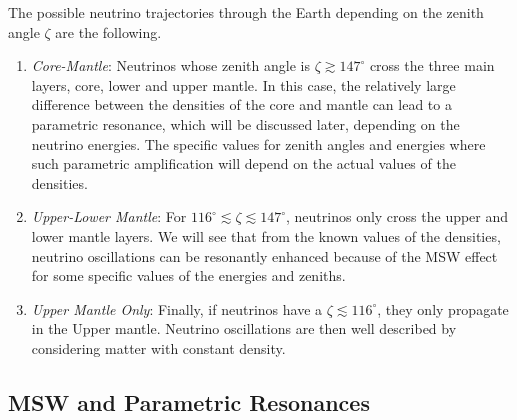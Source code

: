 The possible neutrino trajectories through the Earth depending on the zenith angle $\zeta$ are the following.
\begin{enumerate}
	\item \emph{Core-Mantle}: Neutrinos whose zenith angle is $\zeta \gtrsim 147^{\circ}$ cross the three main layers, core, lower and upper mantle. In this case, the relatively large difference between the densities of the core and mantle  can lead to a parametric resonance, which will be discussed later, depending on the neutrino energies. The specific values for zenith angles and energies where such parametric amplification will depend on the actual values of the densities. 
	\item \emph{Upper-Lower Mantle}: For $116^{\circ} \lesssim \zeta \lesssim 147^{\circ}$, neutrinos only cross the upper and lower mantle layers. We will see that from the known values of the densities, neutrino oscillations can be resonantly enhanced because of the MSW effect for some specific values of the energies and zeniths.
	\item \emph{Upper Mantle Only}: Finally, if neutrinos have a $\zeta \lesssim 116^{\circ}$, they only propagate in the Upper mantle. Neutrino oscillations are then well described by considering matter with constant density. 
\end{enumerate}




\subsection{MSW and Parametric Resonances}

